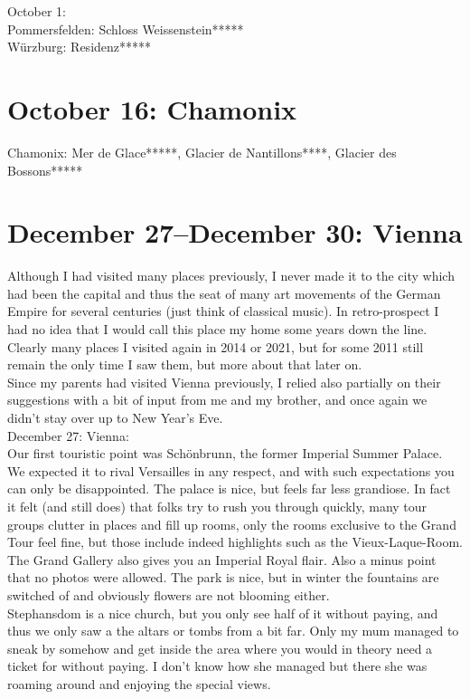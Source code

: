 October 1:\\
Pommersfelden: Schloss Weissenstein*****\\
W\"urzburg: Residenz*****

\section{October 16: Chamonix}
\label{Chamonix2011}

Chamonix: Mer de Glace*****, Glacier de Nantillons****, Glacier des Bossons*****

\section{December 27--December 30: Vienna}
\label{Vienna2011}

Although I had visited many places previously, I never made it to the city which had been the capital and thus the seat of many art movements of the German Empire for several centuries (just think of classical music). In retro-prospect I had no idea that I would call this place my home some years down the line. Clearly many places I visited again in 2014 or 2021, but for some 2011 still remain the only time I saw them, but more about that later on.\\

Since my parents had visited Vienna previously, I relied also partially on their suggestions with a bit of input from me and my brother, and once again we didn't stay over up to New Year's Eve.\\

December 27: Vienna: \\
Our first touristic point was Sch\"onbrunn, the former Imperial Summer Palace. We expected it to rival Versailles in any respect, and with such expectations you can only be disappointed. The palace is nice, but feels far less grandiose. In fact it felt (and still does) that folks try to rush you through quickly, many tour groups clutter in places and fill up rooms, only the rooms exclusive to the Grand Tour feel fine, but those include indeed highlights such as the Vieux-Laque-Room. The Grand Gallery also gives you an Imperial Royal flair. Also a minus point that no photos were allowed. The park is nice, but in winter the fountains are switched of and obviously flowers are not blooming either.\\
Stephansdom is a nice church, but you only see half of it without paying, and thus we only saw a the altars or tombs from a bit far. Only my mum managed to sneak by somehow and get inside the area where you would in theory need a ticket for without paying. I don't know how she managed but there she was roaming around and enjoying the special views.\\

